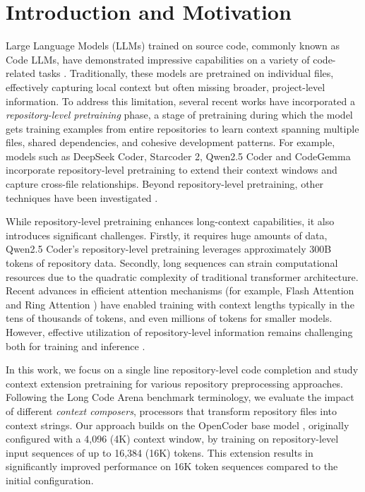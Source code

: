 \section{Introduction and Motivation}

Large Language Models (LLMs) trained on source code, commonly known as Code LLMs, have demonstrated impressive capabilities on a variety of code-related tasks \citep{codexglue, swe-bench, LLM-SE-review, CodeLLM-survey}. Traditionally, these models are pretrained on individual files, effectively capturing local context but often missing broader, project-level information. To address this limitation, several recent works have incorporated a \textit{repository-level pretraining} phase, \ie a stage of pretraining during which the model gets training examples from entire repositories to learn context spanning multiple files, shared dependencies, and cohesive development patterns. For example, models such as DeepSeek Coder, Starcoder 2, Qwen2.5 Coder and CodeGemma \citep{deepseek-coder, starcoder2, qwen2p5coder, codegemma} incorporate repository-level pretraining to extend their context windows and capture cross-file relationships. Beyond repository-level pretraining, other techniques have been investigated \citep{long-coder, repocoder, hirope}.

While repository-level pretraining enhances long-context capabilities, it also introduces significant challenges. Firstly, it requires huge amounts of data, \eg Qwen2.5 Coder’s repository-level pretraining leverages approximately 300B tokens of repository data. Secondly, long sequences can strain computational resources due to the quadratic complexity of traditional transformer architecture. Recent advances in efficient attention mechanisms (for example, Flash Attention and Ring Attention \citep{flash-attention-2, ring-attention}) have enabled training with context lengths typically in the tens of thousands of tokens, and even millions of tokens for smaller models. However, effective utilization of repository-level information remains challenging both for training and inference \citep{cocomic, repobench, cross-code-eval, better-context-better-completion}.

In this work, we focus on a single line repository-level code completion and study context extension pretraining for various repository preprocessing approaches. Following the Long Code Arena benchmark \citep{LCA} terminology, we evaluate the impact of different \textit{context composers}, \ie processors that transform repository files into context strings. Our approach builds on the OpenCoder base model \citep{opencoder}, originally configured with a 4,096 (4K) context window, by training on repository-level input sequences of up to 16,384 (16K) tokens. This extension results in significantly improved performance on 16K token sequences compared to the initial configuration.


